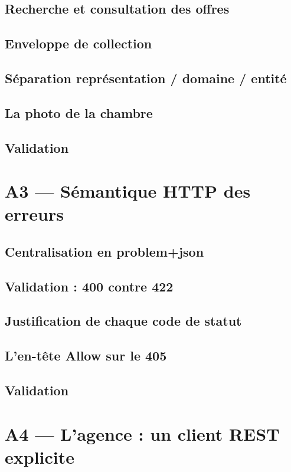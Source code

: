 \documentclass[11pt,a4paper]{report}
\begin{document}
\section{Recherche et consultation des offres}
\section{Enveloppe de collection}
\section{Séparation représentation / domaine / entité}
\section{La photo de la chambre}
\section{Validation}

\chapter{A3 --- Sémantique HTTP des erreurs}
\section{Centralisation en problem+json}
\section{Validation : 400 contre 422}
\section{Justification de chaque code de statut}
\section{L'en-tête Allow sur le 405}
\section{Validation}

\chapter{A4 --- L'agence : un client REST explicite}
\end{document}
